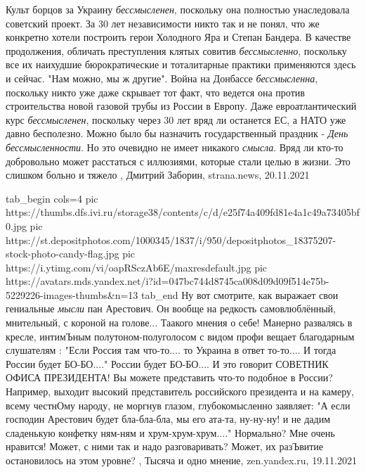 Культ борцов за Украину \emph{бессмысленен}, поскольку она полностью унаследовала
советский проект. За 30 лет независимости никто так и не понял, что же
конкретно хотели построить герои Холодного Яра и Степан Бандера.  В качестве
продолжения, обличать преступления клятых совитив \emph{бессмысленно}, поскольку все
их наихудшие бюрократические и тоталитарные практики применяются здесь и
сейчас. "Нам можно, мы ж другие".  Война на Донбассе \emph{бессмысленна}, поскольку
никто уже даже скрывает тот факт, что ведется она против строительства новой
газовой трубы из России в Европу.  Даже евроатлантический курс \emph{бессмысленен},
поскольку через 30 лет вряд ли останется ЕС, а НАТО уже давно бесполезно.
Можно было бы назначить государственный праздник - \emph{День бессмысленности}. Но это
очевидно не имеет никакого \emph{смысла}. Вряд ли кто-то добровольно может расстаться
с иллюзиями, которые стали целью в жизни. Это слишком больно и тяжело
, 
Дмитрий Заборин, strana.news, 20.11.2021

\ifcmt
  tab_begin cols=4
     pic https://thumbs.dfs.ivi.ru/storage38/contents/c/d/e25f74a409fd81e4a1c49a73405bf0.jpg
     pic https://st.depositphotos.com/1000345/1837/i/950/depositphotos_18375207-stock-photo-candy-flag.jpg
		 pic https://i.ytimg.com/vi/oapRSczAb6E/maxresdefault.jpg
		 pic https://avatars.mds.yandex.net/i?id=047bc744d8745ca008d09d09f514e75b-5229226-images-thumbs&n=13
  tab_end
\fi
Ну вот смотрите, как выражает свои гениальные \emph{мысли} пан Арестович.  Он
вообще на редкость самовлюблённый, мнительный, с короной на голове...  Таакого
мнения о себе!  Манерно развалясь в кресле, интимЪным полутоном-полуголосом с
видом профи вещает благодарным слушателям : "Если Россия там что-то.... то
Украина в ответ то-то.... И тогда России будет БО-БО...." России будет
БО-БО.... И это говорит СОВЕТНИК ОФИСА ПРЕЗИДЕНТА!  Вы можете представить
что-то подобное в России? Например, выходит высокий представитель российского
президента и на камеру, всему честнОму народу, не моргнув глазом,
глубокомысленно заявляет: "А если господин Арестович будет бла-бла-бла, мы его
ата-та, ну-ну-ну! и не дадим сладенькую конфетку ням-ням и хрум-хрум-хрум...."
Нормально? Мне очень нравится! Может, с ними так и надо разговаривать? Может,
их разЪвитие остановилось на этом уровне?
, 
Тысяча и одно мнение, zen.yandex.ru, 19.11.2021 
